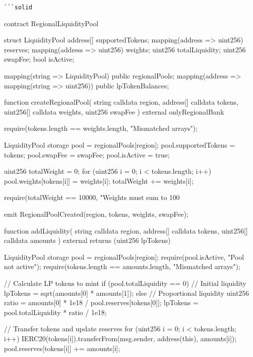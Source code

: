 \documentclass[12pt]{article}
\begin{document}
{{{\begin{lstlisting}
```solid
\end{lstlisting}
contract RegionalLiquidityPool {    struct LiquidityPool {        address[] supportedTokens;        mapping(address => uint256) reserves;        mapping(address => uint256) weights;        uint256 totalLiquidity;        uint256 swapFee;        bool isActive;    }

    mapping(string => LiquidityPool) public regionalPools;    mapping(address => mapping(string => uint256)) public lpTokenBalances;

    function createRegionalPool(        string calldata region,        address[] calldata tokens,        uint256[] calldata weights,        uint256 swapFee    ) external onlyRegionalBank {        require(tokens.length == weights.length, "Mismatched arrays");

        LiquidityPool storage pool = regionalPools[region];        pool.supportedTokens = tokens;        pool.swapFee = swapFee;        pool.isActive = true;

        uint256 totalWeight = 0;        for (uint256 i = 0; i < tokens.length; i++) {            pool.weights[tokens[i]] = weights[i];            totalWeight += weights[i];        }

        require(totalWeight == 10000, "Weights must sum to 100%

        emit RegionalPoolCreated(region, tokens, weights, swapFee);    }

    function addLiquidity(        string calldata region,        address[] calldata tokens,        uint256[] calldata amounts    ) external returns (uint256 lpTokens) {        LiquidityPool storage pool = regionalPools[region];        require(pool.isActive, "Pool not active");        require(tokens.length == amounts.length, "Mismatched arrays");

        // Calculate LP tokens to mint        if (pool.totalLiquidity == 0) {            // Initial liquidity            lpTokens = sqrt(amounts[0] * amounts[1]);        } else {            // Proportional liquidity            uint256 ratio = amounts[0] * 1e18 / pool.reserves[tokens[0]];            lpTokens = pool.totalLiquidity * ratio / 1e18;        }

        // Transfer tokens and update reserves        for (uint256 i = 0; i < tokens.length; i++) {            IERC20(tokens[i]).transferFrom(msg.sender, address(this), amounts[i]);            pool.reserves[tokens[i]] += amounts[i];        }

}}}}}
\end{document}

